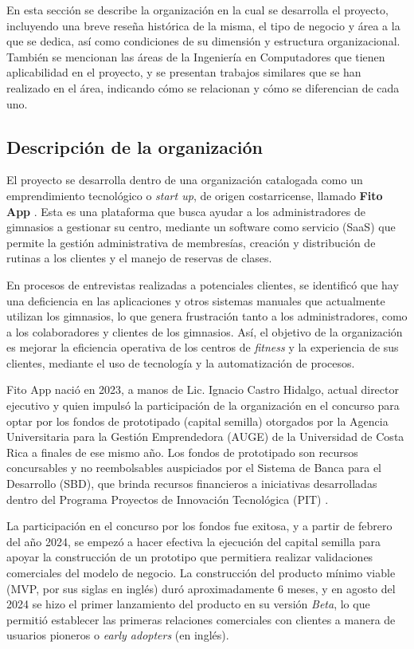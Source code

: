 En esta sección se describe la organización en la cual se desarrolla el proyecto, incluyendo una breve reseña histórica de la misma, el tipo de negocio y área a la que se dedica, así como condiciones de su dimensión y estructura organizacional. También se mencionan las áreas de la Ingeniería en Computadores que tienen aplicabilidad en el proyecto, y se presentan trabajos similares que se han realizado en el área, indicando cómo se relacionan y cómo se diferencian de cada uno.

\subsection{Descripción de la organización}

El proyecto se desarrolla dentro de una organización catalogada como un emprendimiento tecnológico o \textit{start up}, de origen costarricense, llamado \textbf{Fito App} \cite{fito_app}. Esta es una plataforma que busca ayudar a los administradores de gimnasios a gestionar su centro, mediante un software como servicio (SaaS) que permite la gestión administrativa de membresías, creación y distribución de rutinas a los clientes y el manejo de reservas de clases. 

En procesos de entrevistas realizadas a potenciales clientes, se identificó que hay una deficiencia en las aplicaciones y otros sistemas manuales que actualmente utilizan los gimnasios, lo que genera frustración tanto a los administradores, como a los colaboradores y clientes de los gimnasios. Así, el objetivo de la organización es mejorar la eficiencia operativa de los centros de \textit{fitness} y la experiencia de sus clientes, mediante el uso de tecnología y la automatización de procesos.


Fito App nació en 2023, a manos de Lic. Ignacio Castro Hidalgo, actual director ejecutivo y quien impulsó la participación de la organización en el concurso para optar por los fondos de prototipado (capital semilla) otorgados por la Agencia Universitaria para la Gestión Emprendedora (AUGE) de la Universidad de Costa Rica a finales de ese mismo año. Los fondos de prototipado son recursos concursables y no reembolsables auspiciados por el Sistema de Banca para el Desarrollo (SBD), que brinda recursos financieros a iniciativas desarrolladas dentro del Programa Proyectos de Innovación Tecnológica (PIT) \cite{auge_fondos}.

La participación en el concurso por los fondos fue exitosa, y a partir de febrero del año 2024, se empezó a hacer efectiva la ejecución del capital semilla para apoyar la construcción de un prototipo que permitiera realizar validaciones comerciales del modelo de negocio. La construcción del producto mínimo viable (MVP, por sus siglas en inglés) duró aproximadamente 6 meses, y en agosto del 2024 se hizo el primer lanzamiento del producto en su versión \textit{Beta}, lo que permitió establecer las primeras relaciones comerciales con clientes a manera de usuarios pioneros o \textit{early adopters} (en inglés).

